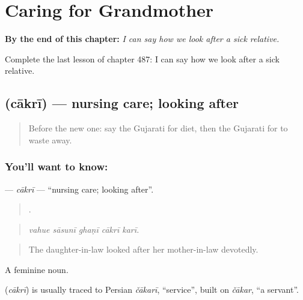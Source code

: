 
\chapter{Caring for Grandmother}
\label{ch:gu-caring-for-grandmother}

\begin{chapteropening}
\textbf{By the end of this chapter:} \emph{I can say how we look after a sick relative.}

Complete the last lesson of chapter 487: I can say how we look after a sick relative.
\end{chapteropening}

\section[\texorpdfstring{\gu{ચાકરી} (cākrī)}{ચાકરી (cākrī)}]{ (cākrī) — nursing care; looking after}

\label{lesson:GU-C487-cakri}



\begin{quote}
Before the new one: say the Gujarati for diet, then the Gujarati for to waste away.
\end{quote}

\subsection*{You'll want to know: }
\textbf{} — \emph{cākrī} — \textquotedblleft{}nursing care; looking after\textquotedblright{}.

\begin{quote}
    .
\end{quote}

\begin{quote}
\emph{vahue sāsunī ghaṇī cākrī karī.}
\end{quote}

\begin{quote}
The daughter-in-law looked after her mother-in-law devotedly.
\end{quote}

A feminine noun.

\begin{cousinweb}
\textbf{} (\emph{cākrī}) is usually traced to Persian \emph{čākarī}, \textquotedblleft{}service\textquotedblright{}, built on \emph{čākar}, \textquotedblleft{}a servant\textquotedblright{}.
\end{cousinweb}

